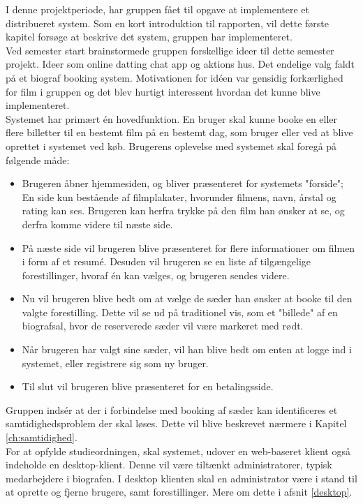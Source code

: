 I denne projektperiode, har gruppen fået til opgave at implementere et distribueret system. Som en kort introduktion til rapporten, vil dette første kapitel forsøge at beskrive det system,
gruppen har implementeret. \\

Ved semester start brainstormede gruppen forskellige ideer til dette semester projekt. 
Ideer som online datting chat app og aktions hus. 
Det endelige valg faldt på et biograf booking system.
Motivationen for idéen var gensidig forkærlighed for film i gruppen 
og det blev hurtigt interessent hvordan det kunne blive implementeret. \\

Systemet har primært én hovedfunktion. En bruger skal kunne booke en eller flere billetter 
til en bestemt film på en bestemt dag, som bruger eller ved at blive oprettet i systemet ved køb.
Brugerens oplevelse med systemet skal foregå på følgende måde:

\begin{itemize}
    \item Brugeren åbner hjemmesiden, og bliver præsenteret for systemets "forside"; En side kun bestående af filmplakater, hvorunder filmens, navn, årstal og rating kan ses. Brugeren kan herfra trykke på den film han ønsker at se, og derfra komme videre til næste side.
    \item På næste side vil brugeren blive præsenteret for flere informationer om filmen i form af et resumé. Desuden vil brugeren se en liste af tilgængelige forestillinger, hvoraf én kan vælges, og brugeren sendes videre.
    \item Nu vil brugeren blive bedt om at vælge de sæder han ønsker at booke til den valgte forestilling. Dette vil se ud på traditionel vis, som et "billede" af en biografsal, hvor de reserverede sæder vil være markeret med rødt.
    \item Når brugeren har valgt sine sæder, vil han blive bedt om enten at logge ind i systemet, eller registrere sig som ny bruger.
    \item Til slut vil brugeren blive præsenteret for en betalingsside.
\end{itemize}

Gruppen indsér at der i forbindelse med booking af sæder kan identificeres et samtidighedsproblem der skal løses. Dette vil blive beskrevet nærmere i Kapitel \ref{ch:samtidighed}. \\

For at opfylde studieordningen, skal systemet, udover en web-baseret klient også indeholde en desktop-klient. Denne vil være tiltænkt administratorer, typisk medarbejdere i biografen.
I desktop klienten skal en administrator være i stand til at oprette og fjerne brugere, samt forestillinger. Mere om dette i afsnit \ref{desktop}.
